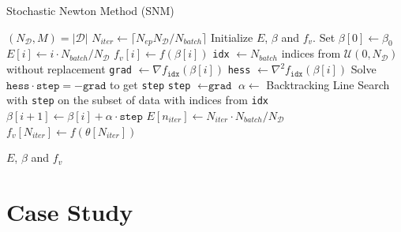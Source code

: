 \documentclass[conference]{IEEEtran}
\let\oldReturn\Return
\renewcommand{\Return}{\State\oldReturn}
\begin{document}
\begin{algorithm*}[t]
\caption{Stochastic Newton Method (SNM)}\label{algo:snm}
\begin{algorithmic}[1]
\State $(N_{\mathcal{D}}, M) = |\mathcal{D}|$ 
\State $N_{iter} \gets \lceil N_{ep}N_{\mathcal{D}}/N_{batch} \rceil$ 
\State Initialize $E$, $\beta$ and $f_v$. Set $\beta[0] \gets \beta_{0}$
\State $E[i] \gets i\cdot N_{batch}/N_{\mathcal{D}}$ 
\State $f_{v}[i] \gets f(\beta[i])$ 
\State \texttt{idx} $\gets N_{batch} $ indices from $\mathcal{U}(0, N_{\mathcal{D}})$ without replacement
\State \texttt{grad} $\gets \nabla f_{\texttt{idx}}(\beta[i])$ 
\State \texttt{hess} $\gets \nabla^2 f_{\texttt{idx}}(\beta[i])$ 
\State Solve $\texttt{hess} \cdot \texttt{step} = -\texttt{grad}$ to get \texttt{step} 
\Else 
\State \texttt{step} $\gets \texttt{grad}$ 
\EndIf
\State $\alpha \gets $ Backtracking Line Search with \texttt{step} on the subset of data  with indices from \texttt{idx}
\State $\beta[i+1] \gets \beta[i] + \alpha \cdot \texttt{step}$
\EndFor
\State $E[n_{iter}] \gets N_{iter}\cdot N_{batch} /N_{\mathcal{D}}$
\State $f_{v}[N_{iter}] \gets f(\theta[N_{iter}])$

\Return $E$, $\beta$ and $f_v$
\EndFunction
\end{algorithmic}
\end{algorithm*}

\section{Case Study}
\label{sec:case_study}
\end{document}
